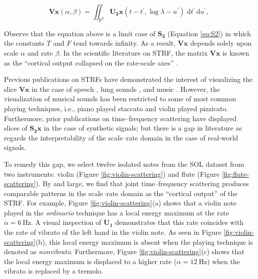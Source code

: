 \documentclass{bmcart}
\begin{document}
\begin{equation}
\mathbf{V}\boldsymbol{x}(\alpha, \beta) =
\iint_{\mathbb{R}^2}
\mathbf{U_2}\boldsymbol{x}(t - t^\prime, \log \lambda - u^\prime)
\;\mathrm{d}t^\prime \, \mathrm{d}u^\prime,
\end{equation}

Observe that the equation above is a limit case of $\mathbf{S_2}$ (Equation \ref{eq:S2}) in which the constants $T$ and $F$ tend towards infinity.
As a result, $\mathbf{V}\boldsymbol{x}$ depends solely upon scale $\alpha$ and rate $\beta$.
In the scientific literature on STRF, the matrix $\mathbf{V}\boldsymbol{x}$ is known as the ``cortical output collapsed on the rate-scale axes'' \cite{elhilali2003speechcomm}.

Previous publications on STRFs have demonstrated the interest of visualizing the slice $\mathbf{V}\boldsymbol{x}$ in the case of speech \cite{bellur2015ciss}, lung sounds \cite{emmanouilidou2012embs}, and music \cite{patil2012ploscompbiol}.
However, the visualization of musical sounds has been restricted to some of most common playing techniques, i.e., piano played staccato and violin played pizzicato.
Furthermore, prior publications on time--frequency scattering have displayed slices of $\mathbf{S_2}\boldsymbol{x}$ in the case of synthetic signals; but there is a gap in literature as regards the interpretability of the scale--rate domain in the case of real-world signals.

To remedy this gap, we select twelve isolated notes from the SOL dataset from two instruments: violin (Figure \ref{fig:violin-scattering}) and flute (Figure \ref{fig:flute-scattering}).
By and large, we find that joint time--frequency scattering produces comparable patterns in the scale--rate domain as the ``cortical output'' of the STRF.
For example, Figure \ref{fig:violin-scattering}(a) shows that a violin note played in the \emph{ordinario} technique has a local energy maximum at the rate $\alpha = \SI{6}{\hertz}$.
A visual inspection of $\mathbf{U_1}$ demonstrates that this rate coincides with the rate of vibrato of the left hand in the violin note.
As seen in Figure \ref{fig:violin-scattering}(b), this local energy maximum is absent when the playing technique is denoted as \emph{nonvibrato}.
Furthermore, Figure \ref{fig:violin-scattering}(c) shows that the local energy maximum is displaced to a higher rate ($\alpha = \SI{12}{\hertz}$) when the vibrato is replaced by a tremolo.
\end{document}
